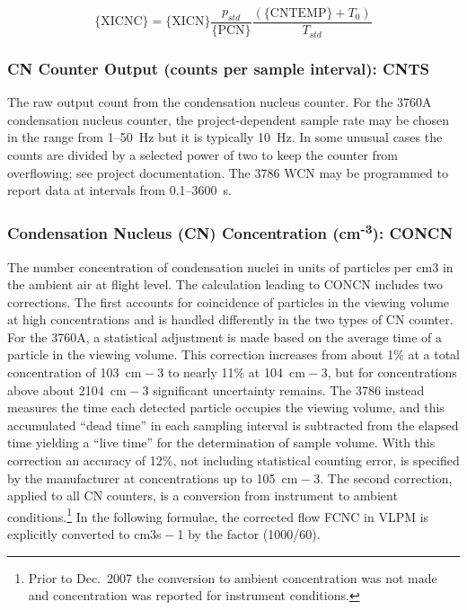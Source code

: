 \documentclass[
]{book}
\begin{document}
\begin{equation}
\mathrm{\{XICNC\} = \{XICN\}}\frac{p_{std}}{\mathrm{\{PCN\}}}\frac{(\{\mathrm{CNTEMP\}}+T_{0})}{T_{std}}
\label{eq:XICNCbox}
\end{equation}

\hypertarget{cnts}{%
\subsubsection*{CN Counter Output (counts per sample interval): CNTS}\label{cnts}}

The raw output count from the condensation nucleus counter. For the 3760A condensation nucleus counter, the project-dependent sample rate may be chosen in the range from 1--50~Hz but it is typically 10~Hz. In some unusual cases the counts are divided by a selected power of two to keep the counter from overflowing; see project documentation. The 3786 WCN may be programmed to report data at intervals from 0.1--3600~s.

\hypertarget{concn}{%
\subsubsection*{\texorpdfstring{Condensation Nucleus (CN) Concentration (cm\textsuperscript{-3}): CONCN}{Condensation Nucleus (CN) Concentration (cm-3): CONCN}}\label{concn}}

The number concentration of condensation nuclei in units of particles per cm{3} in the ambient air at flight level. The calculation leading to CONCN includes two corrections. The first accounts for coincidence of particles in the viewing volume at high concentrations and is handled differently in the two types of CN counter. For the 3760A, a statistical adjustment is made based on the average time of a particle in the viewing volume. This correction increases from about 1\% at a total concentration of 10{3}~cm{ − 3} to nearly 11\% at 10{4}~cm{ − 3}, but for concentrations above about 210{4}~cm{ − 3} significant uncertainty remains. The 3786 instead measures the time each detected particle occupies the viewing volume, and this accumulated ``dead time'' in each sampling interval is subtracted from the elapsed time yielding a ``live time'' for the determination of sample volume. With this correction an accuracy of 12\%, not including statistical counting error, is specified by the manufacturer at concentrations up to 10{5}~cm{ − 3}. The second correction, applied to all CN counters, is a conversion from instrument to ambient conditions.\footnote{Prior to Dec.~2007 the conversion to ambient concentration was not made and concentration was reported for instrument conditions.}
In the following formulae, the corrected flow FCNC in VLPM is explicitly converted to cm{3}s{ − 1} by the factor (1000/60).
\end{document}
